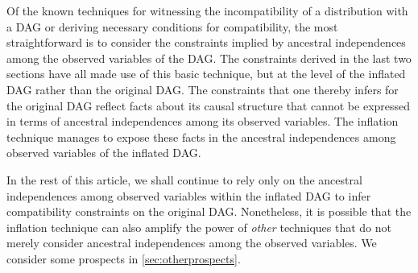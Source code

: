 {Of the known techniques for witnessing the incompatibility of a distribution with a DAG or deriving necessary conditions for compatibility, the most straightforward is to consider the constraints implied by ancestral independences among the observed variables of the DAG. 
The constraints derived in the last two sections have all made use of this basic technique, but at the level of the inflated DAG rather than the original DAG.  The constraints that one thereby infers for the original DAG reflect facts about its causal structure that cannot be expressed in terms of ancestral independences among its observed variables.  The inflation technique manages to expose these facts in the ancestral independences among observed variables of the inflated DAG.


In the rest of this article, we shall continue to rely only on the ancestral independences among observed variables within the inflated DAG to infer compatibility constraints on the original DAG.   Nonetheless, it is possible that the inflation technique can also amplify the power of {\em other} techniques that do not merely consider ancestral independences among the observed variables.  We consider some prospects in \cref{sec:otherprospects}.

}
